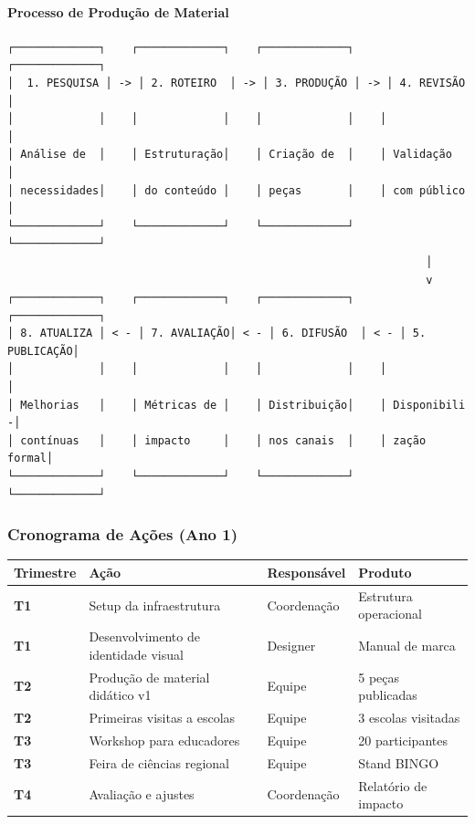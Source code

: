 \paragraph{Processo de Produção de Material}

\begin{verbatim}
┌─────────────┐    ┌─────────────┐    ┌─────────────┐    ┌─────────────┐
│  1. PESQUISA │ -> │ 2. ROTEIRO  │ -> │ 3. PRODUÇÃO │ -> │ 4. REVISÃO  │
│             │    │             │    │             │    │             │
│ Análise de  │    │ Estruturação│    │ Criação de  │    │ Validação   │
│ necessidades│    │ do conteúdo │    │ peças       │    │ com público │
└─────────────┘    └─────────────┘    └─────────────┘    └─────────────┘
                                                                │
                                                                v
┌─────────────┐    ┌─────────────┐    ┌─────────────┐    ┌─────────────┐
│ 8. ATUALIZA │ < - │ 7. AVALIAÇÃO│ < - │ 6. DIFUSÃO  │ < - │ 5. PUBLICAÇÃO│
│             │    │             │    │             │    │             │
│ Melhorias   │    │ Métricas de │    │ Distribuição│    │ Disponibili -│
│ contínuas   │    │ impacto     │    │ nos canais  │    │ zação formal│
└─────────────┘    └─────────────┘    └─────────────┘    └─────────────┘
\end{verbatim}

\subsubsection{Cronograma de Ações (Ano 1)}

\bigskip\noindent
\begin{tabular}{p{}p{}p{}p{}}
\toprule
Trimestre & Ação & Responsável & Produto \\
\hline
\textbf{T1} & Setup da infraestrutura & Coordenação & Estrutura operacional \\
\textbf{T1} & Desenvolvimento de identidade visual & Designer & Manual de marca \\
\textbf{T2} & Produção de material didático v1 & Equipe & 5 peças publicadas \\
\textbf{T2} & Primeiras visitas a escolas & Equipe & 3 escolas visitadas \\
\textbf{T3} & Workshop para educadores & Equipe & 20 participantes \\
\textbf{T3} & Feira de ciências regional & Equipe & Stand BINGO \\
\textbf{T4} & Avaliação e ajustes & Coordenação & Relatório de impacto \\
\bottomrule
\end{tabular}

